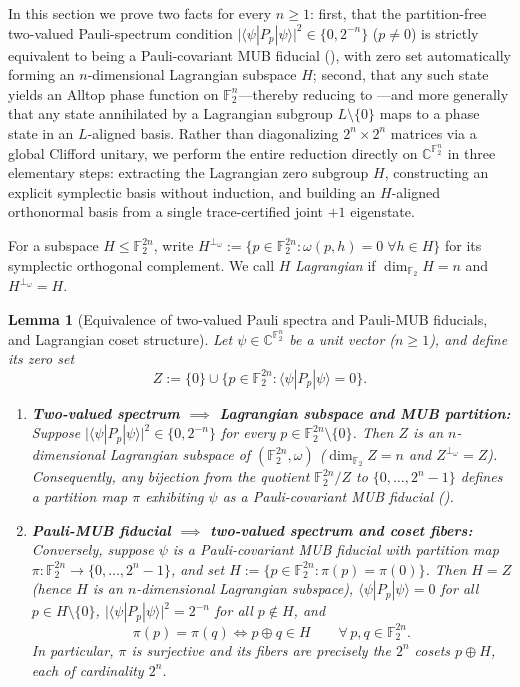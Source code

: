 \documentclass[11pt,a4paper]{article}
\theoremstyle{plain}
\newtheorem{lemma}{Lemma}[section]
\theoremstyle{definition}
\theoremstyle{remark}
\newcommand{\C}{\mathbb{C}}
\newcommand{\F}{\mathbb{F}}
\newcommand{\expval}[2]{\langle#1|#2|#1\rangle}
\newcommand{\abs}[1]{\lvert#1\rvert}
\numberwithin{equation}{section}
\begin{document}
In this section we prove two facts for every $n \ge 1$: first, that the partition-free two-valued Pauli-spectrum condition $\abs{\expval{\psi}{P_p}}^2 \in \{0, 2^{-n}\}$ ($p \neq 0$) is strictly equivalent to being a Pauli-covariant MUB fiducial (), with zero set automatically forming an $n$-dimensional Lagrangian subspace $H$; second, that any such state yields an Alltop phase function on $\F_2^n$---thereby reducing  to ---and more generally that any state annihilated by a Lagrangian subgroup $L \setminus \{0\}$ maps to a phase state in an $L$-aligned basis. Rather than diagonalizing $2^n \times 2^n$ matrices via a global Clifford unitary, we perform the entire reduction directly on $\C^{\F_2^n}$ in three elementary steps: extracting the Lagrangian zero subgroup $H$, constructing an explicit symplectic basis without induction, and building an $H$-aligned orthonormal basis from a single trace-certified joint $+1$ eigenstate.

For a subspace $H \le \F_2^{2n}$, write $H^{\perp_\omega} := \{p \in \F_2^{2n} : \omega(p, h) = 0 \;\forall h \in H\}$ for its symplectic orthogonal complement. We call $H$ \emph{Lagrangian} if $\dim_{\F_2} H = n$ and $H^{\perp_\omega} = H$.

\begin{lemma}[Equivalence of two-valued Pauli spectra and Pauli-MUB fiducials, and Lagrangian coset structure]\label{lem:lagrangian}
Let $\psi \in \C^{\F_2^n}$ be a unit vector ($n \ge 1$), and define its zero set
\[
  Z := \{0\} \cup \{p \in \F_2^{2n} : \expval{\psi}{P_p} = 0\}.
\]
\begin{enumerate}[label=(\roman*),leftmargin=2em]
  \item \textbf{Two-valued spectrum $\implies$ Lagrangian subspace and MUB partition:} Suppose $\abs{\expval{\psi}{P_p}}^2 \in \{0, 2^{-n}\}$ for every $p \in \F_2^{2n} \setminus \{0\}$. Then $Z$ is an $n$-dimensional Lagrangian subspace of $(\F_2^{2n}, \omega)$ ($\dim_{\F_2} Z = n$ and $Z^{\perp_\omega} = Z$). Consequently, any bijection from the quotient $\F_2^{2n}/Z$ to $\{0, \dots, 2^n - 1\}$ defines a partition map $\pi$ exhibiting $\psi$ as a Pauli-covariant MUB fiducial ().
  \item \textbf{Pauli-MUB fiducial $\implies$ two-valued spectrum and coset fibers:} Conversely, suppose $\psi$ is a Pauli-covariant MUB fiducial with partition map $\pi : \F_2^{2n} \to \{0, \dots, 2^n - 1\}$, and set $H := \{p \in \F_2^{2n} : \pi(p) = \pi(0)\}$. Then $H = Z$ (hence $H$ is an $n$-dimensional Lagrangian subspace), $\expval{\psi}{P_p} = 0$ for all $p \in H \setminus \{0\}$, $\abs{\expval{\psi}{P_p}}^2 = 2^{-n}$ for all $p \notin H$, and
  \[
    \pi(p) = \pi(q) \iff p \oplus q \in H \qquad \forall\, p, q \in \F_2^{2n}.
  \]
  In particular, $\pi$ is surjective and its fibers are precisely the $2^n$ cosets $p \oplus H$, each of cardinality $2^n$.
\end{enumerate}
\end{lemma}
\end{document}
